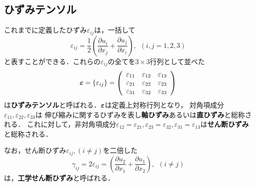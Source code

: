 \documentclass[10pt,a4j]{jbook}
\begin{document}
\subsection{ひずみテンソル}
これまでに定義したひずみ$\varepsilon_{ij}$は，一括して
\begin{equation}
	\varepsilon_{ij}=\frac{1}{2}
	\left(
	\frac{\partial u_i}{\partial x_j}
	+
	\frac{\partial u_j}{\partial x_i}
	\right), \ \ (i,j=1,2,3)
	\label{eqn:def_eij}
\end{equation}
と表すことができる．これらの$\varepsilon_{ij}$の全てを$3\times 3$行列として並べた
\begin{equation}
	\mbox{\boldmath $\varepsilon$}=\left\{ \varepsilon_{ij}\right\}
	=\left(
	\begin{array}{ccc}
		\varepsilon_{11} & \varepsilon_{12} & \varepsilon_{13}\\
		\varepsilon_{21} & \varepsilon_{22} & \varepsilon_{23}\\
		\varepsilon_{31} & \varepsilon_{32} & \varepsilon_{33}
	\end{array}
	\right)
	\label{eqn:def_emat}
\end{equation}
は{\bf ひずみテンソル}と呼ばれる．$\mbox{\boldmath $\varepsilon$}$は定義上対称行列となり，
対角項成分$\varepsilon_{11},\varepsilon_{22},\varepsilon_{33}$は
伸び縮みに関するひずみを表し{\bf 軸ひずみ}あるいは{\bf 直ひずみ}と総称される．
これに対して，非対角項成分$\varepsilon_{12}=\varepsilon_{21},\varepsilon_{23}=\varepsilon_{32},
\varepsilon_{31}=\varepsilon_{13}$は{\bf せん断ひずみ}と総称される．

なお，せん断ひずみ$\varepsilon_{ij},(i\neq j)$を二倍した
\begin{equation}
	\gamma_{ij}=2\varepsilon_{ij}
	=
	\left(
	\frac{\partial u_2}{\partial x_1}
	+
	\frac{\partial u_1}{\partial x_2}
	\right), \ \ (i\neq j)
	\label{eqn:def_g12}
\end{equation}
は，{\bf 工学せん断ひずみ}と呼ばれる．
\end{document}
